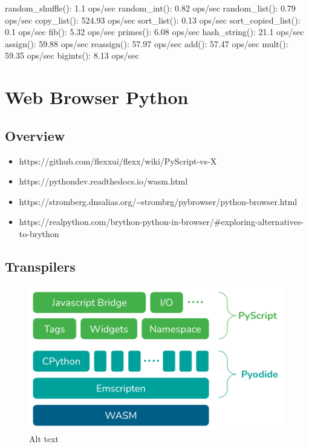 random\_shuffle(): 1.1 ops/sec
random\_int(): 0.82 ops/sec
random\_list(): 0.79 ops/sec
copy\_list(): 524.93 ops/sec
sort\_list(): 0.13 ops/sec
sort\_copied\_list(): 0.1 ops/sec
fib(): 5.32 ops/sec
primes(): 6.08 ops/sec
hash\_string(): 21.1 ops/sec
assign(): 59.88 ops/sec
reassign(): 57.97 ops/sec
add(): 57.47 ops/sec
mult(): 59.35 ops/sec
bigints(): 8.13 ops/sec

\label{notes__03100-python.md}
\section{Web Browser Python}\label{notes__03100-python.md__web-browser-python}

\subsection{Overview}\label{notes__03100-python.md__overview}

\begin{itemize}
\tightlist
\item
  https://github.com/flexxui/flexx/wiki/PyScript-vs-X
\item
  https://pythondev.readthedocs.io/wasm.html
\item
  https://stromberg.dnsalias.org/\textasciitilde strombrg/pybrowser/python-browser.html
\item
  https://realpython.com/brython-python-in-browser/\#exploring-alternatives-to-brython
\end{itemize}

\subsection{Transpilers}\label{notes__03100-python.md__transpilers}

\begin{figure}
\centering
\includegraphics{notes/../figures/pyodide-pyscript.png}
\caption{Alt text}
\end{figure}

